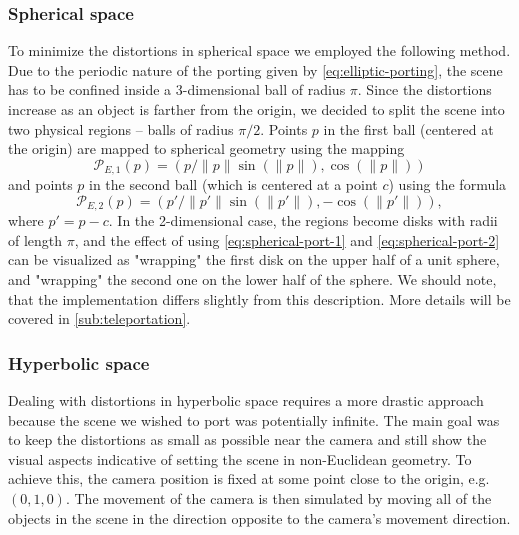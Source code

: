 \subsubsection*{Spherical space}
To minimize the distortions in spherical space we employed the following method.
Due to the periodic nature of the porting given by \autoref{eq:elliptic-porting}, the scene has to be confined inside a 3-dimensional ball of radius $\pi$.
Since the distortions increase as an object is farther from the origin, we decided to split the scene into two physical regions -- balls of radius $\pi / 2$.
Points $p$ in the first ball (centered at the origin) are mapped to spherical geometry using the mapping
\begin{equation} \label{eq:spherical-port-1}
    \mathcal{P}_{E,1}(p) = (p / \lVert p\rVert \sin(\lVert p\rVert), \cos(\lVert p\rVert))
\end{equation}
and points $p$ in the second ball (which is centered at a point $c$) using the formula
\begin{equation}\label{eq:spherical-port-2}
    \mathcal{P}_{E,2}(p) = (p' / \lVert p' \rVert \sin(\lVert p' \rVert), -\cos(\lVert p'\rVert)),
\end{equation}
where $p' = p - c$.
In the 2-dimensional case, the regions become disks with radii of length $\pi$, and the effect of using \autoref{eq:spherical-port-1} and \autoref{eq:spherical-port-2} can be visualized as "wrapping" the first disk on the upper half of a unit sphere, and "wrapping" the second one on the lower half of the sphere.
We should note, that the implementation differs slightly from this description.
More details will be covered in \autoref{sub:teleportation}.

\subsubsection*{Hyperbolic space}
Dealing with distortions in hyperbolic space requires a more drastic approach because the scene we wished to port was potentially infinite.
The main goal was to keep the distortions as small as possible near the camera and still show the visual aspects indicative of setting the scene in non-Euclidean geometry.
To achieve this, the camera position is fixed at some point close to the origin, e.g. $(0, 1, 0)$.
The movement of the camera is then simulated by moving all of the objects in the scene in the direction opposite to the camera's movement direction.